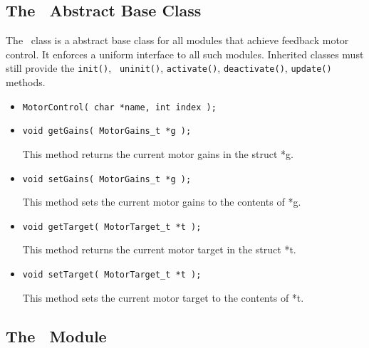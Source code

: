 \subsection{The \MotorControl\ Abstract Base Class}

\begin{moduleheader}
\classname{\MotorControl} \mline
\modulebase{\Module} \mline
{}
\end{moduleheader}

The \MotorControl\ class is a abstract base class for all modules that
achieve feedback motor control. It enforces a uniform interface to all such
modules. Inherited classes must still provide the {\tt init()}, {\tt
uninit()}, {\tt activate()}, {\tt deactivate()}, {\tt update()} methods.  \\

\constructors

\begin{itemize}
\item{\tt MotorControl( char *name, int index ); }
\end{itemize}

\localinterface

\begin{itemize}
\item{\tt void getGains( MotorGains\_t *g );}\par
This method returns the current motor gains in the struct *g.
\item{\tt void setGains( MotorGains\_t *g );}\par
This method sets the current motor gains to the contents of *g.
\item{\tt void getTarget( MotorTarget\_t *t );}\par
This method returns the current motor target in the struct *t.
\item{\tt void setTarget( MotorTarget\_t *t );}\par
This method sets the current motor target to the contents of *t.
\end{itemize}


\subsection{The \PositionControl\ Module}

\begin{moduleheader}
\classname{\PositionControl} \mline
\modulebase{\Module} \mline
{} \mline
{}
\usedmodules{\EncoderReader, \AnalogOutput}
\end{moduleheader}

